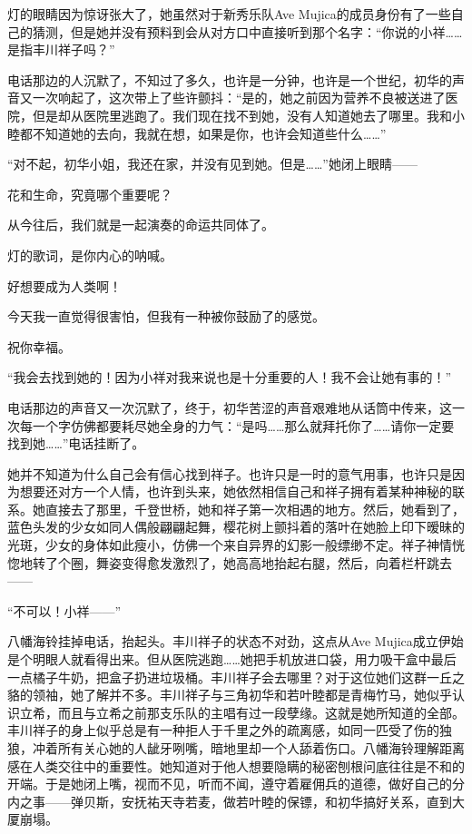 \documentclass{article}
\begin{document}
灯的眼睛因为惊讶张大了，她虽然对于新秀乐队Ave Mujica的成员身份有了一些自己的猜测，但是她并没有预料到会从对方口中直接听到那个名字：“你说的小祥……是指丰川祥子吗？”



电话那边的人沉默了，不知过了多久，也许是一分钟，也许是一个世纪，初华的声音又一次响起了，这次带上了些许颤抖：“是的，她之前因为营养不良被送进了医院，但是却从医院里逃跑了。我们现在找不到她，没有人知道她去了哪里。我和小睦都不知道她的去向，我就在想，如果是你，也许会知道些什么……”



“对不起，初华小姐，我还在家，并没有见到她。但是……”她闭上眼睛——



花和生命，究竟哪个重要呢？



从今往后，我们就是一起演奏的命运共同体了。



灯的歌词，是你内心的呐喊。



好想要成为人类啊！



今天我一直觉得很害怕，但我有一种被你鼓励了的感觉。



祝你幸福。



“我会去找到她的！因为小祥对我来说也是十分重要的人！我不会让她有事的！”



电话那边的声音又一次沉默了，终于，初华苦涩的声音艰难地从话筒中传来，这一次每一个字仿佛都要耗尽她全身的力气：“是吗……那么就拜托你了……请你一定要找到她……”电话挂断了。



她并不知道为什么自己会有信心找到祥子。也许只是一时的意气用事，也许只是因为想要还对方一个人情，也许到头来，她依然相信自己和祥子拥有着某种神秘的联系。她直接去了那里，千登世桥，她和祥子第一次相遇的地方。然后，她看到了，蓝色头发的少女如同人偶般翩翩起舞，樱花树上颤抖着的落叶在她脸上印下暧昧的光斑，少女的身体如此瘦小，仿佛一个来自异界的幻影一般缥缈不定。祥子神情恍惚地转了个圈，舞姿变得愈发激烈了，她高高地抬起右腿，然后，向着栏杆跳去——



“不可以！小祥——”



\newpage



八幡海铃挂掉电话，抬起头。丰川祥子的状态不对劲，这点从Ave Mujica成立伊始是个明眼人就看得出来。但从医院逃跑……她把手机放进口袋，用力吸干盒中最后一点橘子牛奶，把盒子扔进垃圾桶。丰川祥子会去哪里？对于这位她们这群一丘之貉的领袖，她了解并不多。丰川祥子与三角初华和若叶睦都是青梅竹马，她似乎认识立希，而且与立希之前那支乐队的主唱有过一段孽缘。这就是她所知道的全部。丰川祥子的身上似乎总是有一种拒人于千里之外的疏离感，如同一匹受了伤的独狼，冲着所有关心她的人龇牙咧嘴，暗地里却一个人舔着伤口。八幡海铃理解距离感在人类交往中的重要性。她知道对于他人想要隐瞒的秘密刨根问底往往是不和的开端。于是她闭上嘴，视而不见，听而不闻，遵守着雇佣兵的道德，做好自己的分内之事——弹贝斯，安抚祐天寺若麦，做若叶睦的保镖，和初华搞好关系，直到大厦崩塌。
\end{document}
